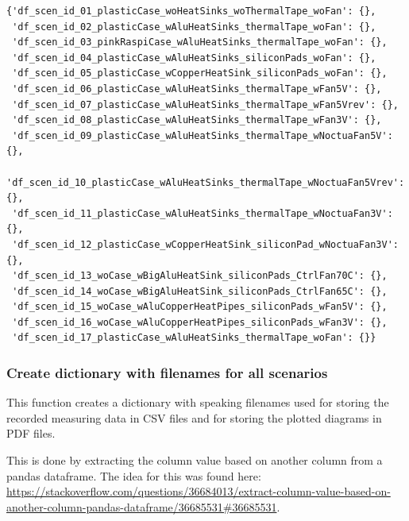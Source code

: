 \documentclass[10pt,parskip=half,
toc=sectionentrywithdots,
bibliography=totocnumbered,
captions=tableheading,numbers=noendperiod]{scrartcl}
\begin{document}
\begin{lstlisting}[language={},postbreak={},numbers=none,xrightmargin=7pt,breakindent=0pt,aboveskip=5pt,belowskip=5pt]
{'df_scen_id_01_plasticCase_woHeatSinks_woThermalTape_woFan': {},
 'df_scen_id_02_plasticCase_wAluHeatSinks_thermalTape_woFan': {},
 'df_scen_id_03_pinkRaspiCase_wAluHeatSinks_thermalTape_woFan': {},
 'df_scen_id_04_plasticCase_wAluHeatSinks_siliconPads_woFan': {},
 'df_scen_id_05_plasticCase_wCopperHeatSink_siliconPads_woFan': {},
 'df_scen_id_06_plasticCase_wAluHeatSinks_thermalTape_wFan5V': {},
 'df_scen_id_07_plasticCase_wAluHeatSinks_thermalTape_wFan5Vrev': {},
 'df_scen_id_08_plasticCase_wAluHeatSinks_thermalTape_wFan3V': {},
 'df_scen_id_09_plasticCase_wAluHeatSinks_thermalTape_wNoctuaFan5V': {},
 'df_scen_id_10_plasticCase_wAluHeatSinks_thermalTape_wNoctuaFan5Vrev': {},
 'df_scen_id_11_plasticCase_wAluHeatSinks_thermalTape_wNoctuaFan3V': {},
 'df_scen_id_12_plasticCase_wCopperHeatSink_siliconPad_wNoctuaFan3V': {},
 'df_scen_id_13_woCase_wBigAluHeatSink_siliconPads_CtrlFan70C': {},
 'df_scen_id_14_woCase_wBigAluHeatSink_siliconPads_CtrlFan65C': {},
 'df_scen_id_15_woCase_wAluCopperHeatPipes_siliconPads_wFan5V': {},
 'df_scen_id_16_woCase_wAluCopperHeatPipes_siliconPads_wFan3V': {},
 'df_scen_id_17_plasticCase_wAluHeatSinks_thermalTape_woFan': {}}
\end{lstlisting}

\hypertarget{create-dictionary-with-filenames-for-all-scenarios}{%
\subsubsection{Create dictionary with filenames for all
scenarios}\label{create-dictionary-with-filenames-for-all-scenarios}}

This function creates a dictionary with speaking filenames used for
storing the recorded measuring data in CSV files and for storing the
plotted diagrams in PDF files.

This is done by extracting the column value based on another column from
a pandas dataframe. The idea for this was found here:
\url{https://stackoverflow.com/questions/36684013/extract-column-value-based-on-another-column-pandas-dataframe/36685531\#36685531}.
\end{document}
